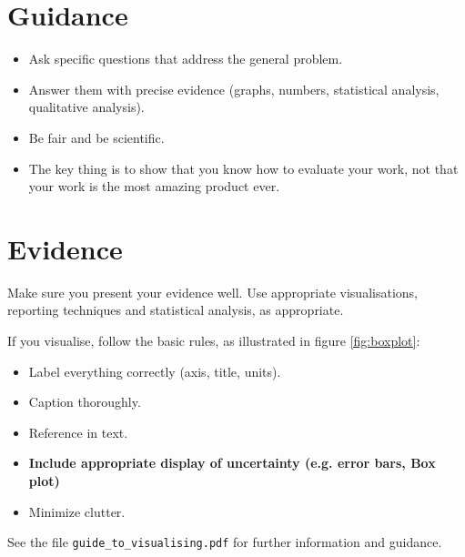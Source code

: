 \documentclass{l4proj}
\begin{document}
\section{Guidance}
\begin{itemize}
    \item
        Ask specific questions that address the general problem.
    \item
        Answer them with precise evidence (graphs, numbers, statistical
        analysis, qualitative analysis).
    \item
        Be fair and be scientific.
    \item
        The key thing is to show that you know how to evaluate your work, not
        that your work is the most amazing product ever.
\end{itemize}

\section{Evidence}
Make sure you present your evidence well. Use appropriate visualisations, reporting techniques and statistical analysis, as appropriate.

If you visualise, follow the basic rules, as illustrated in figure \ref{fig:boxplot}:
\begin{itemize}
\item Label everything correctly (axis, title, units).
\item Caption thoroughly.
\item Reference in text.
\item \textbf{Include appropriate display of uncertainty (e.g. error bars, Box plot)}
\item Minimize clutter.
\end{itemize}

See the file \texttt{guide\_to\_visualising.pdf} for further information and guidance.
\end{document}

